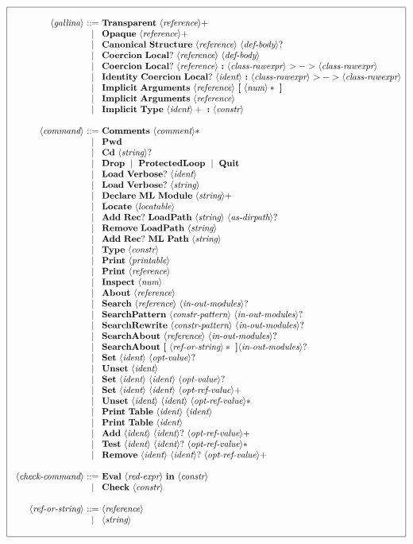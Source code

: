 \documentclass{article}
\makeatletter
\def\NT#1{\langle\textit{#1}\rangle}
\def\TERM#1{{\bf\textrm{\bf #1}}}
\def\KWD#1{\TERM{#1}}
\def\STAR#1{#1*}
\def\PLUS#1{#1+}
\def\OPT#1{#1?}
\newenvironment{cadre}
        {\begin{array}{|c|}\hline\\}
        {\\\\\hline\end{array}}
\newenvironment{rulebox}
        {$$\begin{cadre}\begin{array}{r@{~}c@{~}l@{}l@{}r}}
        {\end{array}\end{cadre}$$}
\def\DEFNT#1{\NT{#1} & ::= &}
\def\SEPDEF{\\\\}
\def\nlsep{\\&|&}
\newenvironment{rules}
        {\begin{center}\begin{rulebox}}
        {\end{rulebox}\end{center}}
\makeatother
\begin{document}
\begin{rules}
\DEFNT{gallina}
       \TERM{Transparent}~\PLUS{\NT{reference}}
\nlsep \TERM{Opaque}~\PLUS{\NT{reference}}
\nlsep \TERM{Canonical}~\TERM{Structure}~\NT{reference}~\OPT{\NT{def-body}}
\nlsep \TERM{Coercion}~\OPT{\TERM{Local}}~\NT{reference}~\NT{def-body}
\nlsep \TERM{Coercion}~\OPT{\TERM{Local}}~\NT{reference}~\KWD{:}
       ~\NT{class-rawexpr}~\TERM{$>->$}~\NT{class-rawexpr}
\nlsep \TERM{Identity}~\TERM{Coercion}~\OPT{\TERM{Local}}~\NT{ident}~\KWD{:}
       ~\NT{class-rawexpr}~\TERM{$>->$}~\NT{class-rawexpr}
\nlsep \TERM{Implicit}~\TERM{Arguments}~\NT{reference}~\TERM{[}~\STAR{\NT{num}}~\TERM{]}
\nlsep \TERM{Implicit}~\TERM{Arguments}~\NT{reference}
\nlsep \TERM{Implicit}~\KWD{Type}~\PLUS{\NT{ident}}~\KWD{:}~\NT{constr}
\SEPDEF
\DEFNT{command}
       \TERM{Comments}~\STAR{\NT{comment}}
\nlsep \TERM{Pwd}
\nlsep \TERM{Cd}~\OPT{\NT{string}}
\nlsep \TERM{Drop} ~\mid~ \TERM{ProtectedLoop} ~\mid~\TERM{Quit}
\nlsep \TERM{Load}~\OPT{\TERM{Verbose}}~\NT{ident}
\nlsep \TERM{Load}~\OPT{\TERM{Verbose}}~\NT{string}
\nlsep \TERM{Declare}~\TERM{ML}~\TERM{Module}~\PLUS{\NT{string}}
\nlsep \TERM{Locate}~\NT{locatable}
\nlsep \TERM{Add}~\OPT{\TERM{Rec}}~\TERM{LoadPath}~\NT{string}~\OPT{\NT{as-dirpath}}
\nlsep \TERM{Remove}~\TERM{LoadPath}~\NT{string}
\nlsep \TERM{Add}~\OPT{\TERM{Rec}}~\TERM{ML}~\TERM{Path}~\NT{string}
\nlsep \KWD{Type}~\NT{constr}
\nlsep \TERM{Print}~\NT{printable}
\nlsep \TERM{Print}~\NT{reference}
\nlsep \TERM{Inspect}~\NT{num}
\nlsep \TERM{About}~\NT{reference}
\nlsep \TERM{Search}~\NT{reference}~\OPT{\NT{in-out-modules}}
\nlsep \TERM{SearchPattern}~\NT{constr-pattern}~\OPT{\NT{in-out-modules}}
\nlsep \TERM{SearchRewrite}~\NT{constr-pattern}~\OPT{\NT{in-out-modules}}
\nlsep \TERM{SearchAbout}~\NT{reference}~\OPT{\NT{in-out-modules}}
\nlsep \TERM{SearchAbout}~\TERM{[}~\STAR{\NT{ref-or-string}}~\TERM{]}\OPT{\NT{in-out-modules}}
\nlsep \KWD{Set}~\NT{ident}~\OPT{\NT{opt-value}}
\nlsep \TERM{Unset}~\NT{ident}
\nlsep \KWD{Set}~\NT{ident}~\NT{ident}~\OPT{\NT{opt-value}}
\nlsep \KWD{Set}~\NT{ident}~\NT{ident}~\PLUS{\NT{opt-ref-value}}
\nlsep \TERM{Unset}~\NT{ident}~\NT{ident}~\STAR{\NT{opt-ref-value}}
\nlsep \TERM{Print}~\TERM{Table}~\NT{ident}~\NT{ident}
\nlsep \TERM{Print}~\TERM{Table}~\NT{ident}
\nlsep \TERM{Add}~\NT{ident}~\OPT{\NT{ident}}~\PLUS{\NT{opt-ref-value}}
\nlsep \TERM{Test}~\NT{ident}~\OPT{\NT{ident}}~\STAR{\NT{opt-ref-value}}
\nlsep \TERM{Remove}~\NT{ident}~\OPT{\NT{ident}}~\PLUS{\NT{opt-ref-value}}
\SEPDEF
\DEFNT{check-command}
       \TERM{Eval}~\NT{red-expr}~\KWD{in}~\NT{constr}
\nlsep \TERM{Check}~\NT{constr}
\SEPDEF
\DEFNT{ref-or-string}
       \NT{reference}
\nlsep \NT{string}
\end{rules}
\end{document}
